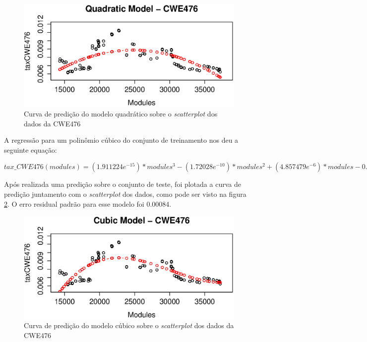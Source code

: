 \begin{figure}[h]
  \centering
  \includegraphics[width=1.0\textwidth]
      {figuras/cwe476-quadratic.eps}
      \caption{Curva de predição do modelo quadrático sobre o \textit{scatterplot}
      dos dados da CWE476}
  \label{fig:cwe476-quadratic}
\end{figure}

A regressão para um polinômio cúbico do conjunto de treinamento nos deu a
seguinte equação:

\begin{math}
 tax\_CWE476(modules) = (1.911224e^{-15}) * modules^{3} - (1.72028e^{-10}) *
 modules^{2} + (4.857479e^{-6}) * modules - 0.03460173
\end{math}

Após realizada uma predição sobre o conjunto de teste, foi plotada a curva de
predição juntamento com o \textit{scatterplot} dos dados, como pode ser visto na
figura \ref{fig:cwe476-cubic}. O erro residual padrão para esse modelo foi
0.00084.

\begin{figure}[h]
  \centering
  \includegraphics[width=1.0\textwidth]
      {figuras/cwe476-cubic.eps}
      \caption{Curva de predição do modelo cúbico sobre o \textit{scatterplot}
      dos dados da CWE476}
  \label{fig:cwe476-cubic}
\end{figure}


